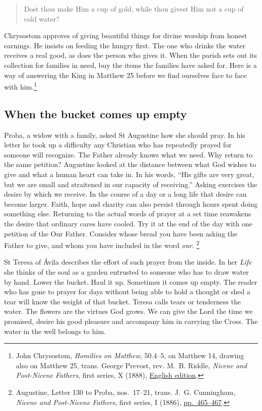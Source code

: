\begin{quote}
Dost thou make Him a cup of gold, while thou givest Him not a cup of cold water?
\end{quote}

Chrysostom approves of giving beautiful things for divine worship from honest
earnings. He insists on feeding the hungry first. The one who drinks the water
receives a real good, as does the person who gives it. When the parish sets
out its collection for families in need, buy the items the families have
asked for. Here is a way of answering the King in Matthew 25 before we find
ourselves face to face with him.\footnote{John Chrysostom,
\emph{Homilies on Matthew}, 50.4--5, on Matthew 14, drawing also on
Matthew 25, trans. George Prevost, rev. M.~B. Riddle, \emph{Nicene and
Post-Nicene Fathers}, first series, X (1888),
\href{https://www.ccel.org/ccel/schaff/npnf110.html}{English edition}.}

\subsection{When the bucket comes up empty}

Proba, a widow with a family, asked St Augustine how she should pray. In
his letter he took up a difficulty any Christian who has repeatedly prayed
for someone will recognize. The Father already knows what we need. Why
return to the same petition? Augustine looked at the distance between what
God wishes to give and what a human heart can take in. In his words, “His
gifts are very great, but we are small and straitened in our capacity of
receiving.” Asking exercises the desire by which we receive. In the course
of a day or a long life that desire can become larger. Faith, hope and
charity can also persist through hours spent doing something else. Returning
to the actual words of prayer at a set time reawakens the desire that
ordinary cares have cooled. Try it at the end of the day with one petition
of the Our Father. Consider whose bread you have been asking the Father
to give, and whom you have included in the word \emph{our}.
\footnote{Augustine, Letter 130 to Proba, nos.~17--21, trans.
J.~G. Cunningham, \emph{Nicene and Post-Nicene Fathers}, first series, I
(1886), \href{https://www.ccel.org/ccel/schaff/npnf101.html}{pp.~465--467}.}

St Teresa of Ávila describes the effort of such prayer from the inside.
In her \emph{Life} she thinks of the soul as a garden entrusted to someone
who has to draw water by hand. Lower the bucket. Haul it up. Sometimes it
comes up empty. The reader who has gone to prayer for days without being
able to hold a thought or shed a tear will know the weight of that bucket.
Teresa calls tears or tenderness the water. The flowers are the virtues
God grows. We can give the Lord the time we promised, desire his good
pleasure and accompany him in carrying the Cross. The water in the well
belongs to him.

